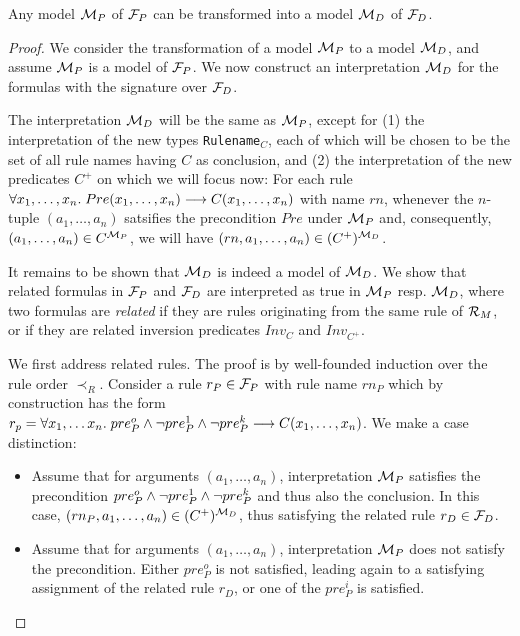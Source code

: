 \begin{proposition}\label{lemma:mp_to_md}
  Any model ${\cal M}_P$ of ${\cal F}_P$ can be transformed into a model
  ${\cal M}_D$ of ${\cal F}_D$.
\end{proposition}

\begin{proof}
  We consider the transformation of a model ${\cal M}_P$ to a model
  ${\cal M}_D$, and assume ${\cal M}_P$ is a model of ${\cal F}_P$. 
  We now construct an interpretation ${\cal M}_D$ for the formulas with the
  signature over ${\cal F}_D$.

  The interpretation ${\cal M}_D$ will be the same as ${\cal M}_P$,
  except for (1) the interpretation of the new types \texttt{Rulename$_C$},
  each of which will be chosen to be the set of all rule names having $C$ as
  conclusion, and (2) the interpretation of the new predicates $C^+$ on which
  we will focus now: 
  For each rule  $\forall x_1, \dots, x_n.\; Pre(x_1,
  \dots, x_n) \longrightarrow C(x_1, \dots, x_n)$ with name  $rn$, whenever the $n$-tuple
  $(a_1, \dots, a_n)$ satsifies the precondition $Pre$ under ${\cal M}_P$ and, consequently,
  $(a_1, \dots, a_n) \in C^{{\cal M}_P}$, we will have   $(rn, a_1, \dots, a_n) \in (C^+)^{{\cal M}_D}$.

  It remains to be shown that ${\cal M}_D$ is indeed a model of ${\cal
    M}_D$. We show that related formulas in ${\cal F}_P$ and ${\cal F}_D$
  are interpreted as true in ${\cal M}_P$ resp.{} ${\cal M}_D$, where two
  formulas are \emph{related} if they are rules originating from the same rule
  of ${\cal R}_M$, or if they are related inversion predicates $Inv_C$ and $Inv_{C^+}$.

  We first address related rules. The proof is by well-founded induction over
  the rule order $\prec_R$. Consider a rule $r_P \in {\cal F}_P$ with rule
  name $rn_P$ which by construction has the form
  $r_p = \forall x_1, \dots x_n.\; pre_P^o \land \lnot pre_P^1 \land \lnot pre_P^k
  \longrightarrow C(x_1, \dots, x_n)$.
  We make a case distinction:
  \begin{itemize}
  \item Assume that for arguments $(a_1, \dots, a_n)$, interpretation
    ${\cal M}_P$ satisfies the precondition
    $pre_P^o \land \lnot pre_P^1 \land \lnot pre_P^k$ and thus also the
    conclusion. In this case, $(rn_P, a_1, \dots, a_n)\in (C^+)^{{\cal M}_D}$, thus
    satisfying the related rule $r_D \in {\cal F}_D$.
  \item Assume that for arguments $(a_1, \dots, a_n)$, interpretation
    ${\cal M}_P$ does not satisfy the precondition. Either $pre_P^o$ is not
    satisfied, leading again to a satisfying assignment of the related rule
    $r_D$, or one of the $pre_P^i$ is satisfied.


\end{itemize}
\end{proof}
